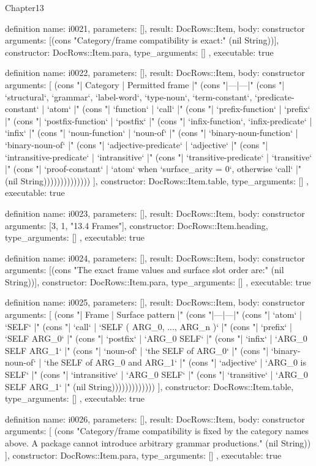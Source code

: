 \begin{lexlean}{Chapter13}
\begin{semanticmodule}
definition{
  name: i0021,
  parameters: [],
  result: DocRows::Item,
  body: constructor{
    arguments: [(cons "Category/frame compatibility is exact:" (nil String))],
    constructor: DocRows::Item.para,
    type_arguments: []
  },
  executable: true
}

definition{
  name: i0022,
  parameters: [],
  result: DocRows::Item,
  body: constructor{
    arguments: [
      (cons "| Category | Permitted frame |" (cons "|---|---|" (cons "| `structural`, `grammar`, `label-word`, `type-noun`, `term-constant`, `predicate-constant` | `atom` |" (cons "| `function` | `call` |" (cons "| `prefix-function` | `prefix` |" (cons "| `postfix-function` | `postfix` |" (cons "| `infix-function`, `infix-predicate` | `infix` |" (cons "| `noun-function` | `noun-of` |" (cons "| `binary-noun-function` | `binary-noun-of` |" (cons "| `adjective-predicate` | `adjective` |" (cons "| `intransitive-predicate` | `intransitive` |" (cons "| `transitive-predicate` | `transitive` |" (cons "| `proof-constant` | `atom` when `surface_arity = 0`, otherwise `call` |" (nil String))))))))))))))
    ],
    constructor: DocRows::Item.table,
    type_arguments: []
  },
  executable: true
}

definition{
  name: i0023,
  parameters: [],
  result: DocRows::Item,
  body: constructor{
    arguments: [3, 1, "13.4 Frames"],
    constructor: DocRows::Item.heading,
    type_arguments: []
  },
  executable: true
}

definition{
  name: i0024,
  parameters: [],
  result: DocRows::Item,
  body: constructor{
    arguments: [(cons "The exact frame values and surface slot order are:" (nil String))],
    constructor: DocRows::Item.para,
    type_arguments: []
  },
  executable: true
}

definition{
  name: i0025,
  parameters: [],
  result: DocRows::Item,
  body: constructor{
    arguments: [
      (cons "| Frame | Surface pattern |" (cons "|---|---|" (cons "| `atom` | `SELF` |" (cons "| `call` | `SELF ( ARG_0, ..., ARG_n )` |" (cons "| `prefix` | `SELF ARG_0` |" (cons "| `postfix` | `ARG_0 SELF` |" (cons "| `infix` | `ARG_0 SELF ARG_1` |" (cons "| `noun-of` | `the SELF of ARG_0` |" (cons "| `binary-noun-of` | `the SELF of ARG_0 and ARG_1` |" (cons "| `adjective` | `ARG_0 is SELF` |" (cons "| `intransitive` | `ARG_0 SELF` |" (cons "| `transitive` | `ARG_0 SELF ARG_1` |" (nil String)))))))))))))
    ],
    constructor: DocRows::Item.table,
    type_arguments: []
  },
  executable: true
}

definition{
  name: i0026,
  parameters: [],
  result: DocRows::Item,
  body: constructor{
    arguments: [
      (cons "Category/frame compatibility is fixed by the category names above. A package cannot introduce arbitrary grammar productions." (nil String))
    ],
    constructor: DocRows::Item.para,
    type_arguments: []
  },
  executable: true
}


\end{semanticmodule}
\end{lexlean}
